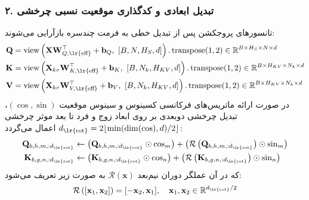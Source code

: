 \subsubsection*{۲. تبدیل ابعادی و کدگذاری موقعیت نسبی چرخشی }
تانسورهای پروجکشن پس از تبدیل خطی به فرمت چندسره بازآرایی می‌شوند:
\begin{align}
\mathbf{Q} &= \operatorname{view}\left(\mathbf{X} \mathbf{W}_{Q,\text{\lr{eff}}}^\top + \mathbf{b}_Q, \ [B, N, H_S, d]\right).\operatorname{transpose}(1, 2) \in \mathbb{R}^{B \times H_S \times N \times d} \\
\mathbf{K} &= \operatorname{view}\left(\mathbf{X}_{kv} \mathbf{W}_{K,\text{\lr{eff}}}^\top + \mathbf{b}_K, \ [B, N_k, H_{KV}, d]\right).\operatorname{transpose}(1, 2) \in \mathbb{R}^{B \times H_{KV} \times N_k \times d} \\
\mathbf{V} &= \operatorname{view}\left(\mathbf{X}_{kv} \mathbf{W}_{V,\text{\lr{eff}}}^\top + \mathbf{b}_V, \ [B, N_k, H_{KV}, d]\right).\operatorname{transpose}(1, 2) \in \mathbb{R}^{B \times H_{KV} \times N_k \times d}
\end{align}
در صورت ارائه ماتریس‌های فرکانسی کسینوس و سینوس موقعیت $(\cos, \sin)$، تبدیل چرخشی دو‌بعدی بر روی ابعاد زوج و فرد تا بعد موثر چرخشی $d_{\text{\lr{rot}}} = 2 \lfloor \min(\dim(\cos), d) / 2 \rfloor$ اعمال می‌گردد:
\begin{align}
\mathbf{Q}_{b, h, m, :d_{\text{\lr{rot}}}} &\leftarrow \left( \mathbf{Q}_{b, h, m, :d_{\text{\lr{rot}}}} \odot \cos_m \right) + \left( \mathcal{R}\left( \mathbf{Q}_{b, h, m, :d_{\text{\lr{rot}}}} \right) \odot \sin_m \right) \\
\mathbf{K}_{b, g, n, :d_{\text{\lr{rot}}}} &\leftarrow \left( \mathbf{K}_{b, g, n, :d_{\text{\lr{rot}}}} \odot \cos_n \right) + \left( \mathcal{R}\left( \mathbf{K}_{b, g, n, :d_{\text{\lr{rot}}}} \right) \odot \sin_n \right)
\end{align}
که در آن عملگر دوران نیم‌بعد $\mathcal{R}(\mathbf{x})$ به صورت زیر تعریف می‌شود:
\begin{equation}
\mathcal{R}\left( [\mathbf{x}_1, \mathbf{x}_2] \right) = [-\mathbf{x}_2, \mathbf{x}_1], \quad \mathbf{x}_1, \mathbf{x}_2 \in \mathbb{R}^{d_{\text{\lr{rot}}}/2}
\end{equation}

